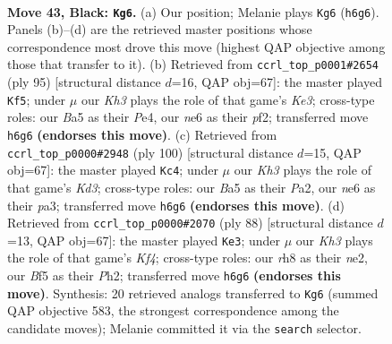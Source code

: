 \documentclass[11pt]{article}
\begin{document}
\clearpage

\begin{figure}[p]\centering
\begin{subfigure}{0.46\textwidth}\centering
\resizebox{\linewidth}{!}{%
\newchessgame
\chessboard[
  setfen={7R/8/2p1N2k/bp3b2/8/8/8/5K2 b - - 2 43},
  showmover=false,
  pgfstyle=straightmove, color=movearrow, markmove={h6-g6}
]}
\caption{}
\end{subfigure}\hfill
\begin{subfigure}{0.46\textwidth}\centering
\resizebox{\linewidth}{!}{%
\newchessgame
\chessboard[
  setfen={8/8/4k1R1/6p1/3bp3/8/5PK1/8 b - - 0 48},
  showmover=false,
  pgfstyle=straightmove, color=movearrow, markmove={e6-f5}
]}
\caption{}
\end{subfigure}
\\[4pt]
\begin{subfigure}{0.46\textwidth}\centering
\resizebox{\linewidth}{!}{%
\newchessgame
\chessboard[
  setfen={8/6p1/8/2n1k3/8/p2K1B2/P6P/8 w - - 8 51},
  showmover=false,
  pgfstyle=straightmove, color=movearrow, markmove={d3-c4}
]}
\caption{}
\end{subfigure}\hfill
\begin{subfigure}{0.46\textwidth}\centering
\resizebox{\linewidth}{!}{%
\newchessgame
\chessboard[
  setfen={5k2/8/8/8/p1B2K2/8/4n2P/8 w - - 0 45},
  showmover=false,
  pgfstyle=straightmove, color=movearrow, markmove={f4-e3}
]}
\caption{}
\end{subfigure}
\caption{\textbf{Move 43, Black: \texttt{Kg6}.} (a) Our position; Melanie plays \texttt{Kg6} (\texttt{h6g6}). Panels (b)--(d) are the retrieved master positions whose correspondence most drove this move (highest QAP objective among those that transfer to it). (b) Retrieved from \texttt{ccrl\_top\_p0001\#2654} (ply 95) [structural distance $d$=16, QAP obj=67]: the master played \texttt{Kf5}; under $\mu$ our \emph{Kh3} plays the role of that game's \emph{Ke3}; cross-type roles: our \emph{B}a5 as their \emph{P}e4, our \emph{n}e6 as their \emph{p}f2; transferred move \texttt{h6g6} \textbf{(endorses this move)}. (c) Retrieved from \texttt{ccrl\_top\_p0000\#2948} (ply 100) [structural distance $d$=15, QAP obj=67]: the master played \texttt{Kc4}; under $\mu$ our \emph{Kh3} plays the role of that game's \emph{Kd3}; cross-type roles: our \emph{B}a5 as their \emph{P}a2, our \emph{n}e6 as their \emph{p}a3; transferred move \texttt{h6g6} \textbf{(endorses this move)}. (d) Retrieved from \texttt{ccrl\_top\_p0000\#2070} (ply 88) [structural distance $d$=13, QAP obj=67]: the master played \texttt{Ke3}; under $\mu$ our \emph{Kh3} plays the role of that game's \emph{Kf4}; cross-type roles: our \emph{r}h8 as their \emph{n}e2, our \emph{B}f5 as their \emph{P}h2; transferred move \texttt{h6g6} \textbf{(endorses this move)}. Synthesis: 20 retrieved analogs transferred to \texttt{Kg6} (summed QAP objective 583, the strongest correspondence among the candidate moves); Melanie committed it via the \texttt{search} selector.}
\label{fig:thought-m85}
\end{figure}
\end{document}
